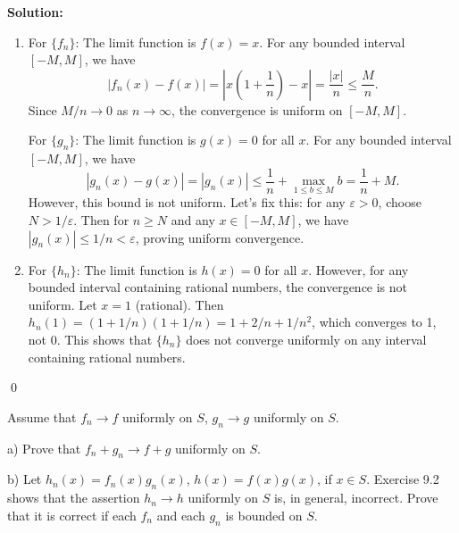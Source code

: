 \bigskip\noindent\textbf{Solution:} 
\begin{enumerate}[label=(\alph*)]
\item For \(\{f_n\}\): The limit function is \( f(x) = x \). For any bounded interval \([-M, M]\), we have
\[|f_n(x) - f(x)| = \left|x \left(1 + \frac{1}{n}\right) - x\right| = \frac{|x|}{n} \leq \frac{M}{n}.\]
Since \( M/n \to 0 \) as \( n \to \infty \), the convergence is uniform on \([-M, M]\).

For \(\{g_n\}\): The limit function is \( g(x) = 0 \) for all \( x \). For any bounded interval \([-M, M]\), we have
\[|g_n(x) - g(x)| = |g_n(x)| \leq \frac{1}{n} + \max_{1 \leq b \leq M} b = \frac{1}{n} + M.\]
However, this bound is not uniform. Let's fix this: for any \( \varepsilon > 0 \), choose \( N > 1/\varepsilon \). Then for \( n \geq N \) and any \( x \in [-M, M] \), we have \( |g_n(x)| \leq 1/n < \varepsilon \), proving uniform convergence.

\item For \(\{h_n\}\): The limit function is \( h(x) = 0 \) for all \( x \). However, for any bounded interval containing rational numbers, the convergence is not uniform. Let \( x = 1 \) (rational). Then \( h_n(1) = (1 + 1/n)(1 + 1/n) = 1 + 2/n + 1/n^2 \), which converges to 1, not 0. This shows that \(\{h_n\}\) does not converge uniformly on any interval containing rational numbers.
\end{enumerate}\qed


\begin{problembox}
Assume that \( f_n \to f \) uniformly on \( S \), \( g_n \to g \) uniformly on \( S \).

a) Prove that \( f_n + g_n \to f + g \) uniformly on \( S \).

b) Let \( h_n(x) = f_n(x) g_n(x) \), \( h(x) = f(x) g(x) \), if \( x \in S \). Exercise 9.2 shows that the assertion \( h_n \to h \) uniformly on \( S \) is, in general, incorrect. Prove that it is correct if each \( f_n \) and each \( g_n \) is bounded on \( S \).
\end{problembox}

